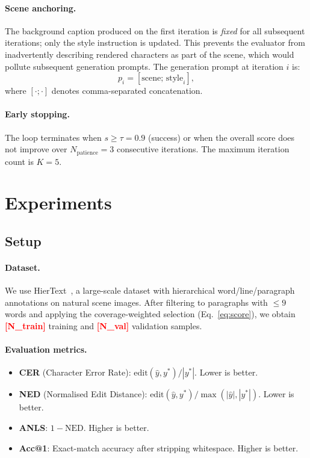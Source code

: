 \documentclass[uplatex,10pt,twocolumn,a4paper]{article}
\newcommand{\TODO}[1]{\textcolor{red}{\textbf{[#1]}}}
\begin{document}
\paragraph{Scene anchoring.}
The background caption produced on the first iteration is \emph{fixed}
for all subsequent iterations; only the style instruction is updated.
This prevents the evaluator from inadvertently describing rendered
characters as part of the scene, which would pollute subsequent
generation prompts.
The generation prompt at iteration $i$ is:
\begin{equation}
  p_i = [\text{scene};\, \text{style}_i],
  \label{eq:prompt}
\end{equation}
where $[\cdot;\cdot]$ denotes comma-separated concatenation.

\paragraph{Early stopping.}
The loop terminates when $s \geq \tau = 0.9$ (success) or when the
overall score does not improve over $N_\mathrm{patience} = 3$
consecutive iterations.
The maximum iteration count is $K = 5$.

\section{Experiments}
\label{sec:experiments}

\subsection{Setup}

\paragraph{Dataset.}
We use HierText~\cite{hiertext2022}, a large-scale dataset with
hierarchical word/line/paragraph annotations on natural scene images.
After filtering to paragraphs with $\leq 9$ words and applying the
coverage-weighted selection (Eq.~\ref{eq:score}), we obtain
\TODO{N\_train} training and \TODO{N\_val} validation samples.

\paragraph{Evaluation metrics.}
\begin{itemize}
  \item \textbf{CER} (Character Error Rate): $\text{edit}(\hat{y},
    y^*) / |y^*|$. Lower is better.
  \item \textbf{NED} (Normalised Edit Distance): $\text{edit}(\hat{y},
    y^*) / \max(|\hat{y}|, |y^*|)$. Lower is better.
  \item \textbf{ANLS}: $1 - \text{NED}$. Higher is better.
  \item \textbf{Acc@1}: Exact-match accuracy after stripping
    whitespace. Higher is better.
\end{itemize}
\end{document}
